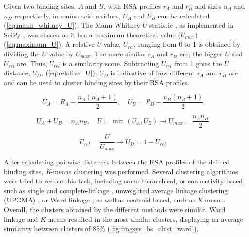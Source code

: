 Given two binding sites, $A$ and $B$, with RSA profiles $r_{A}$ and $r_{B}$ and sizes $n_{A}$ and $n_{B}$ respectively, in amino acid residues, $U_{A}$ and $U_{B}$ can be calculated (\autoref{eq:mann_whitney_U}). The Mann-Whitney $U$ statistic \cite{MANN_WHITNEY_1947_TEST}, as implemented in SciPy \cite{VIRTANEN_2020_SCIPY}, was chosen as it has a maximum theoretical value ($U_{max}$) (\autoref{eq:maximum_U}). A relative $U$ value, $U_{rel}$, ranging from 0 to 1 is obtained by dividing the $U$ value by $U_{max}$. The more similar $r_{A}$ and $r_{B}$ are, the bigger $U$ and $U_{rel}$ are. Thus, $U_{rel}$ is a similarity score. Subtracting $U_{rel}$ from 1 gives the $U$ distance, $U_{D}$, (\autoref{eq:relative_U}). $U_{D}$ is indicative of how different $r_{A}$ and $r_{B}$ are and can be used to cluster binding sites by their RSA profiles.

\begin{equation}
U_A = R_A - \frac{n_A(n_A + 1)}{2}, \quad U_B = R_B - \frac{n_B(n_B + 1)}{2} \quad
\label{eq:mann_whitney_U}
\end{equation}

\vspace{-31pt} %

\begin{equation}
U_A + U_B = n_A n_B, \quad U = \min(U_A, U_B) \rightarrow U_{max} = \frac{n_A n_B}{2} \quad
\label{eq:maximum_U} 
\end{equation}

\vspace{-31pt} %

\begin{equation}
U_{rel} = \frac{U}{U_{max}} \rightarrow U_D = 1 - U_{rel} \quad 
\label{eq:relative_U}
\end{equation}

\vspace{-12pt} %

After calculating pairwise distances between the RSA profiles of the defined binding sites, \textit{K}-means clustering \cite{LLOYD_1982_KMEANS} was performed. Several clustering algorithms were tried to realise this task, including some hierarchical, or connectivity-based, such as single and complete-linkage \cite{SORENSEN_1948_CL}, unweighted average linkage clustering (UPGMA) \cite{SOKAL_1958_UPGMA}, or Ward linkage \cite{WARD_1963_CLUSTERING}, as well as centroid-based, such as \textit{K}-means. Overall, the clusters obtained by the different methods were similar. Ward linkage and \textit{K}-means resulted in the most similar clusters, displaying an average similarity between clusters of 85\% (\autoref{fig:fragsys_bs_clust_ward}).

